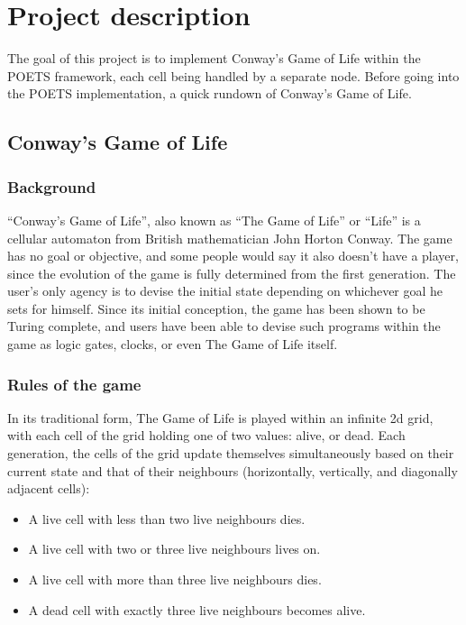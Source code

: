 \documentclass[a4paper]{article}
\begin{document}



\section*{Project description} %
The goal of this project is to implement Conway's Game of Life\cite{enwiki:1115969544} within the POETS framework, each cell being handled by a separate node. Before going into the POETS implementation, a quick rundown of Conway's Game of Life.

\subsection*{Conway's Game of Life}
\subsubsection*{Background}
``Conway's Game of Life'', also known as ``The Game of Life'' or ``Life'' is a cellular automaton from British mathematician John Horton Conway. The game has no goal or objective, and some people would say it also doesn't have a player, since the evolution of the game is fully determined from the first generation. The user's only agency is to devise the initial state depending on whichever goal he sets for himself. Since its initial conception, the game has been shown to be Turing complete\cite{rendell2002turing}, and users have been able to devise such programs within the game as logic gates, clocks, or even The Game of Life itself.

\subsubsection*{Rules of the game}
In its traditional form, The Game of Life is played within an infinite 2d grid, with each cell of the grid holding one of two values: alive, or dead. Each generation, the cells of the grid update themselves simultaneously based on their current state and that of their neighbours (horizontally, vertically, and diagonally adjacent cells):
\begin{itemize}
    \item A live cell with less than two live neighbours dies.
    \item A live cell with two or three live neighbours lives on.
    \item A live cell with more than three live neighbours dies.
    \item A dead cell with exactly three live neighbours becomes alive.
\end{itemize}
\end{document}
